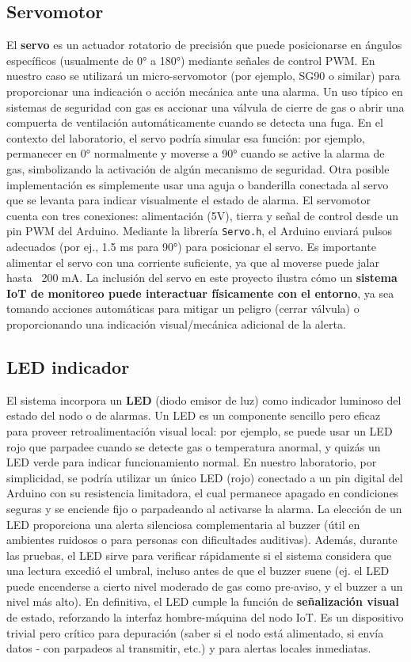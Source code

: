 \subsection{Servomotor}
El \textbf{servo} es un actuador rotatorio de precisión que puede posicionarse en ángulos específicos (usualmente de 0° a 180°) mediante señales de control PWM. En nuestro caso se utilizará un micro-servomotor (por ejemplo, SG90 o similar) para proporcionar una indicación o acción mecánica ante una alarma. Un uso típico en sistemas de seguridad con gas es accionar una válvula de cierre de gas o abrir una compuerta de ventilación automáticamente cuando se detecta una fuga. En el contexto del laboratorio, el servo podría simular esa función: por ejemplo, permanecer en 0° normalmente y moverse a 90° cuando se active la alarma de gas, simbolizando la activación de algún mecanismo de seguridad. Otra posible implementación es simplemente usar una aguja o banderilla conectada al servo que se levanta para indicar visualmente el estado de alarma. El servomotor cuenta con tres conexiones: alimentación (5V), tierra y señal de control desde un pin PWM del Arduino. Mediante la librería \texttt{Servo.h}, el Arduino enviará pulsos adecuados (por ej., 1.5 ms para 90°) para posicionar el servo. Es importante alimentar el servo con una corriente suficiente, ya que al moverse puede jalar hasta ~200 mA. La inclusión del servo en este proyecto ilustra cómo un \textbf{sistema IoT de monitoreo puede interactuar físicamente con el entorno}, ya sea tomando acciones automáticas para mitigar un peligro (cerrar válvula) o proporcionando una indicación visual/mecánica adicional de la alerta.

\subsection{LED indicador}
El sistema incorpora un \textbf{LED} (diodo emisor de luz) como indicador luminoso del estado del nodo o de alarmas. Un LED es un componente sencillo pero eficaz para proveer retroalimentación visual local: por ejemplo, se puede usar un LED rojo que parpadee cuando se detecte gas o temperatura anormal, y quizás un LED verde para indicar funcionamiento normal. En nuestro laboratorio, por simplicidad, se podría utilizar un único LED (rojo) conectado a un pin digital del Arduino con su resistencia limitadora, el cual permanece apagado en condiciones seguras y se enciende fijo o parpadeando al activarse la alarma. La elección de un LED proporciona una alerta silenciosa complementaria al buzzer (útil en ambientes ruidosos o para personas con dificultades auditivas). Además, durante las pruebas, el LED sirve para verificar rápidamente si el sistema considera que una lectura excedió el umbral, incluso antes de que el buzzer suene (ej. el LED puede encenderse a cierto nivel moderado de gas como pre-aviso, y el buzzer a un nivel más alto). En definitiva, el LED cumple la función de \textbf{señalización visual} de estado, reforzando la interfaz hombre-máquina del nodo IoT. Es un dispositivo trivial pero crítico para depuración (saber si el nodo está alimentado, si envía datos - con parpadeos al transmitir, etc.) y para alertas locales inmediatas.

